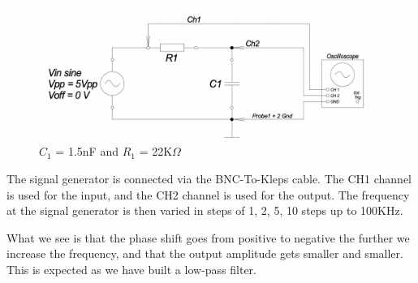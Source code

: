 \begin{figure}[H]
    \centering
    \includegraphics[scale=0.5]{images/part1_circuit.png}
    \caption{$C_1$ = 1.5nF and $R_1$ = 22K$\Omega$}
\end{figure}


The signal generator is connected via the BNC-To-Kleps cable. The CH1 channel is used for the input, and the CH2 channel is used for the output.
The frequency at the signal generator is then varied in steps of 1, 2, 5, 10 steps up to 100KHz.




What we see is that the phase shift goes from positive to negative the further we increase the frequency, and that the output amplitude gets smaller and smaller. This is expected as we have built a low-pass filter.